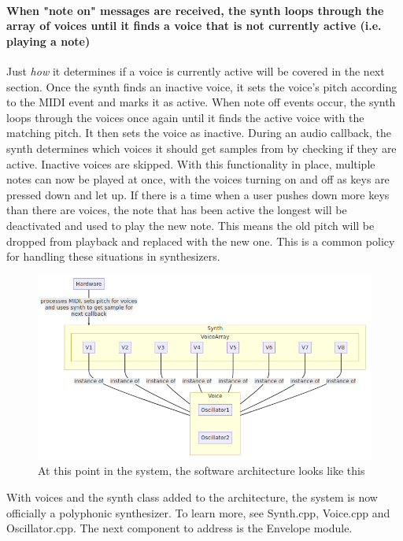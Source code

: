 \documentclass[acmlarge,screen]{acmart}
\begin{document}
	\paragraph{When "note on" messages are received, the synth loops through the array of voices until it finds a voice that is not currently active (i.e. playing a note)} Just \textit{how} it determines if a voice is currently active will be covered in the next section. Once the synth finds an inactive voice, it sets the voice's pitch according to the MIDI event and marks it as active. When note off events occur, the synth loops through the voices once again until it finds the active voice with the matching pitch. It then sets the voice as inactive. During an audio callback, the synth determines which voices it should get samples from by checking if they are active. Inactive voices are skipped. With this functionality in place, multiple notes can now be played at once, with the voices turning on and off as keys are pressed down and let up. If there is a time when a user pushes down more keys than there are voices, the note that has been active the longest will be deactivated and used to play the new note. This means the old pitch will be dropped from playback and replaced with the new one. This is a common policy for handling these situations in synthesizers.
	
	\begin{figure}[H]
		\includegraphics[width=\linewidth]{voice_graph_diagram}
		\caption{At this point in the system, the software architecture looks like this}
		\centering
	\end{figure}
	
	With voices and the synth class added to the architecture, the system is now officially a polyphonic synthesizer. To learn more, see Synth.cpp, Voice.cpp and Oscillator.cpp. The next component to address is the Envelope module.
\end{document}
